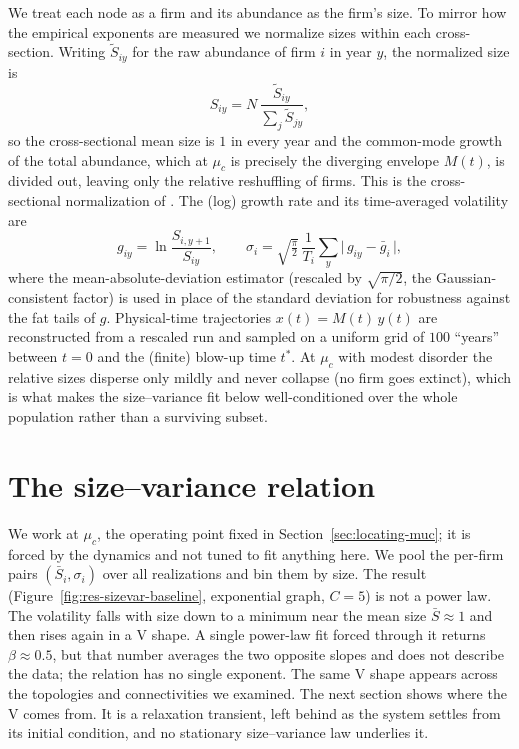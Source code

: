 We treat each node as a firm and its abundance as the firm's size. To mirror how the
empirical exponents are measured we normalize sizes within each cross-section. Writing
$\tilde{S}_{iy}$ for the raw abundance of firm $i$ in year $y$, the normalized size is
\begin{equation}
    S_{iy} = N\,\frac{\tilde{S}_{iy}}{\sum_j \tilde{S}_{jy}},
    \label{eq:size-norm}
\end{equation}
so the cross-sectional mean size is $1$ in every year and the common-mode growth of
the total abundance, which at $\mu_c$ is precisely the diverging envelope $M(t)$, is
divided out, leaving only the relative reshuffling of firms. This is the
cross-sectional normalization of \citet{moran2024}. The (log) growth rate and its
time-averaged volatility are
\begin{equation}
    g_{iy} = \ln\frac{S_{i,y+1}}{S_{iy}}, \qquad
    \sigma_i = \sqrt{\tfrac{\pi}{2}}\,\frac{1}{T_i}\sum_y \bigl|\,g_{iy}-\bar{g}_i\,\bigr|,
    \label{eq:vol-mad}
\end{equation}
where the mean-absolute-deviation estimator (rescaled by $\sqrt{\pi/2}$, the
Gaussian-consistent factor) is used in place of the standard deviation for robustness
against the fat tails of $g$. Physical-time trajectories $x(t)=M(t)\,y(t)$ are
reconstructed from a rescaled run and sampled on a uniform grid of $100$ ``years''
between $t=0$ and the (finite) blow-up time $t^\ast$. At $\mu_c$ with modest disorder
the relative sizes disperse only mildly and
never collapse (no firm goes extinct), which is what makes the size--variance fit
below well-conditioned over the whole population rather than a surviving subset.

\section{The size--variance relation}
\label{sec:sizevar-baseline}

We work at $\mu_c$, the operating point fixed in Section~\ref{sec:locating-muc}; it is
forced by the dynamics and not tuned to fit anything here. We pool the per-firm pairs
$(\bar{S}_i,\sigma_i)$ over all realizations and bin them by size. The result
(Figure~\ref{fig:res-sizevar-baseline}, exponential graph, $C=5$) is not a power law.
The volatility falls with size down to a minimum near the mean size $\bar{S}\approx1$
and then rises again in a V shape. A single power-law fit forced through
it returns $\beta\approx0.5$, but that number averages the two opposite slopes and
does not describe the data; the relation has no single exponent. The same V shape
appears across the topologies and connectivities we examined. The next section shows
where the V comes from. It is a relaxation transient, left behind as the system settles
from its initial condition, and no stationary size--variance law underlies it.

